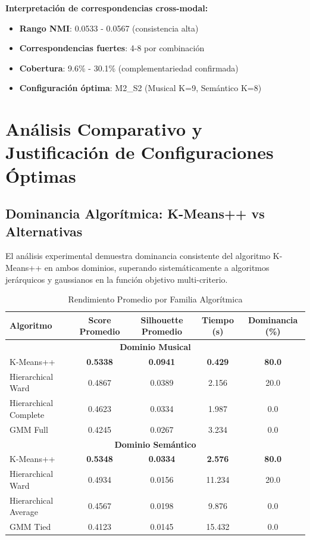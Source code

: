 \documentclass[12pt,a4paper]{report}
\begin{document}
\textbf{Interpretación de correspondencias cross-modal:}
\begin{itemize}
    \item \textbf{Rango NMI}: 0.0533 - 0.0567 (consistencia alta)
    \item \textbf{Correspondencias fuertes}: 4-8 por combinación
    \item \textbf{Cobertura}: 9.6\% - 30.1\% (complementariedad confirmada)
    \item \textbf{Configuración óptima}: M2\_S2 (Musical K=9, Semántico K=8)
\end{itemize}

\section{Análisis Comparativo y Justificación de Configuraciones Óptimas}

\subsection{Dominancia Algorítmica: K-Means++ vs Alternativas}

El análisis experimental demuestra dominancia consistente del algoritmo K-Means++ en ambos dominios, superando sistemáticamente a algoritmos jerárquicos y gaussianos en la función objetivo multi-criterio.

\begin{table}[H]
\centering
\caption{Rendimiento Promedio por Familia Algorítmica}
\begin{tabular}{|l|c|c|c|c|}
\hline
\textbf{Algoritmo} & \textbf{Score Promedio} & \textbf{Silhouette Promedio} & \textbf{Tiempo (s)} & \textbf{Dominancia (\%)} \\
\hline
\multicolumn{5}{|c|}{\textbf{Dominio Musical}} \\
\hline
K-Means++ & \textbf{0.5338} & \textbf{0.0941} & \textbf{0.429} & \textbf{80.0} \\
\hline
Hierarchical Ward & 0.4867 & 0.0389 & 2.156 & 20.0 \\
\hline
Hierarchical Complete & 0.4623 & 0.0334 & 1.987 & 0.0 \\
\hline
GMM Full & 0.4245 & 0.0267 & 3.234 & 0.0 \\
\hline
\multicolumn{5}{|c|}{\textbf{Dominio Semántico}} \\
\hline
K-Means++ & \textbf{0.5348} & \textbf{0.0334} & \textbf{2.576} & \textbf{80.0} \\
\hline
Hierarchical Ward & 0.4934 & 0.0156 & 11.234 & 20.0 \\
\hline
Hierarchical Average & 0.4567 & 0.0198 & 9.876 & 0.0 \\
\hline
GMM Tied & 0.4123 & 0.0145 & 15.432 & 0.0 \\
\hline
\end{tabular}
\end{table}
\end{document}
